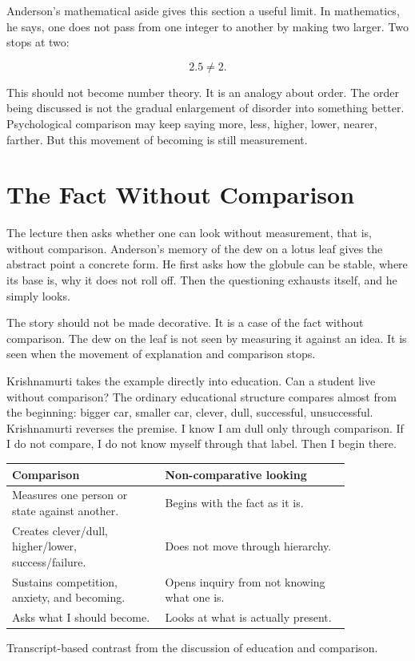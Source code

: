 \documentclass[11pt,oneside]{book}
\begin{document}
Anderson's mathematical aside gives this section a useful limit. In mathematics, he says, one does not pass from one integer to another by making two larger. Two stops at two:

\begin{equation}
2.5\neq 2.
\end{equation}

This should not become number theory. It is an analogy about order. The order being discussed is not the gradual enlargement of disorder into something better. Psychological comparison may keep saying more, less, higher, lower, nearer, farther. But this movement of becoming is still measurement.

\section{The Fact Without Comparison}

The lecture then asks whether one can look without measurement, that is, without comparison. Anderson's memory of the dew on a lotus leaf gives the abstract point a concrete form. He first asks how the globule can be stable, where its base is, why it does not roll off. Then the questioning exhausts itself, and he simply looks.

The story should not be made decorative. It is a case of the fact without comparison. The dew on the leaf is not seen by measuring it against an idea. It is seen when the movement of explanation and comparison stops.

Krishnamurti takes the example directly into education. Can a student live without comparison? The ordinary educational structure compares almost from the beginning: bigger car, smaller car, clever, dull, successful, unsuccessful. Krishnamurti reverses the premise. I know I am dull only through comparison. If I do not compare, I do not know myself through that label. Then I begin there.

\begin{table}
\centering
\begin{tabular}{|p{0.38\linewidth}|p{0.46\linewidth}|}
\hline
\textbf{Comparison} & \textbf{Non-comparative looking}\\
\hline
Measures one person or state against another. & Begins with the fact as it is.\\
\hline
Creates clever/dull, higher/lower, success/failure. & Does not move through hierarchy.\\
\hline
Sustains competition, anxiety, and becoming. & Opens inquiry from not knowing what one is.\\
\hline
Asks what I should become. & Looks at what is actually present.\\
\hline
\end{tabular}

Transcript-based contrast from the discussion of education and comparison.
\end{table}
\end{document}
